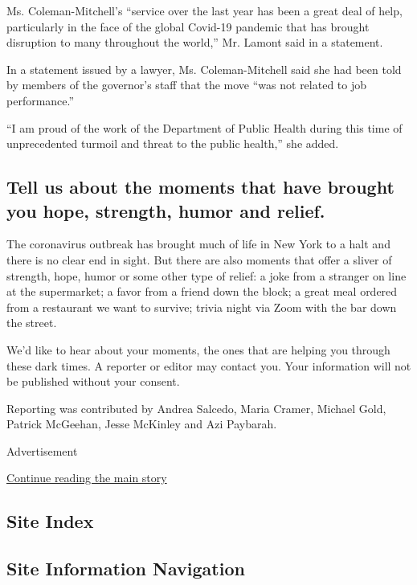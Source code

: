 Ms. Coleman-Mitchell's ``service over the last year has been a great
deal of help, particularly in the face of the global Covid-19 pandemic
that has brought disruption to many throughout the world,'' Mr. Lamont
said in a statement.

In a statement issued by a lawyer, Ms. Coleman-Mitchell said she had
been told by members of the governor's staff that the move ``was not
related to job performance.''

``I am proud of the work of the Department of Public Health during this
time of unprecedented turmoil and threat to the public health,'' she
added.

\hypertarget{tell-us-about-the-moments-that-have-brought-you-hope-strength-humor-and-relief}{%
\subsection{Tell us about the moments that have brought you hope,
strength, humor and
relief.}\label{tell-us-about-the-moments-that-have-brought-you-hope-strength-humor-and-relief}}

The coronavirus outbreak has brought much of life in New York to a halt
and there is no clear end in sight. But there are also moments that
offer a sliver of strength, hope, humor or some other type of relief: a
joke from a stranger on line at the supermarket; a favor from a friend
down the block; a great meal ordered from a restaurant we want to
survive; trivia night via Zoom with the bar down the street.

We'd like to hear about your moments, the ones that are helping you
through these dark times. A reporter or editor may contact you. Your
information will not be published without your consent.

Reporting was contributed by Andrea Salcedo, Maria Cramer, Michael Gold,
Patrick McGeehan, Jesse McKinley and Azi Paybarah.

Advertisement

\protect\hyperlink{after-bottom}{Continue reading the main story}

\hypertarget{site-index}{%
\subsection{Site Index}\label{site-index}}

\hypertarget{site-information-navigation}{%
\subsection{Site Information
Navigation}\label{site-information-navigation}}

